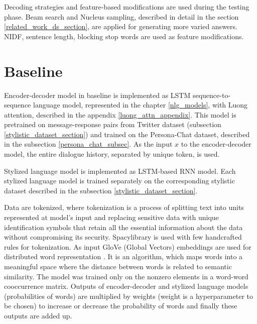 Decoding strategies and feature-based modifications are used during the testing phase. Beam search and Nucleus sampling, described in detail in the section \ref{related_work_ds_section}, are applied for generating more varied answers. NIDF, sentence length, blocking stop words are used as feature modifications.

\section{Baseline}
Encoder-decoder model in baseline is implemented as LSTM sequence-to-sequence language model, represented in the chapter \ref{nlg_models}, with Luong attention, described in the appendix \ref{luong_attn_appendix}. This model is pretrained on message-response pairs from Twitter dataset (subsection \ref{stylistic_dataset_section}) and trained on the Persona-Chat dataset, described in the subsection \ref{persona_chat_subsec}. As the input $x$ to the encoder-decoder model, the entire dialogue history, separated by unique token, is used.

Stylized language model is implemented as LSTM-based RNN model. Each stylized language model is trained separately on the corresponding stylistic dataset described in the subsection \ref{stylistic_dataset_section}.

Data are tokenized, where tokenization is a process of splitting text into units represented at model's input and replacing sensitive data with unique identification symbols that retain all the essential information about the data without compromising its security. Spacy\protect\footnotemark library is used with few handcrafted rules for tokenization. As input GloVe (Global Vectors) embeddings are used for distributed word representation \cite{pennington2014glove}. It is an algorithm, which maps words into a meaningful space where the distance between words is related to semantic similarity. The model was trained only on the nonzero elements in a word-word cooccurrence matrix. Outputs of encoder-decoder and stylized language models (probabilities of words) are multiplied by weights (weight is a hyperparameter to be chosen) to increase or decrease the probability of words and finally these outputs are added up.



